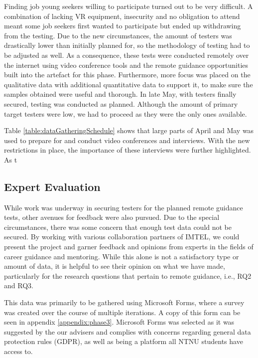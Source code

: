 Finding job young seekers willing to participate turned out to be very difficult. A combination of lacking VR equipment, insecurity and no obligation to attend meant some job seekers first wanted to participate but ended up withdrawing from the testing. Due to the new circumstances, the amount of testers was drastically lower than initially planned for, so the methodology of testing had to be adjusted as well. As a consequence, these tests were conducted remotely over the internet using video conference tools and the remote guidance opportunities built into the artefact for this phase. Furthermore, more focus was placed on the qualitative data with additional quantitative data to support it, to make sure the samples obtained were useful and thorough. In late May, with testers finally secured, testing was conducted as planned. Although the amount of primary target testers were low, we had to proceed as they were the only ones available.   

Table \ref{table:dataGatheringSchedule} shows that large parts of April and May was used to prepare for and conduct video conferences and interviews. With the new restrictions in place, the importance of these interviews were further highlighted. As t

\subsection{Expert Evaluation}
\label{section:phase3_expertEval}
While work was underway in securing testers for the planned remote guidance tests, other avenues for feedback were also pursued. Due to the special circumstances, there was some concern that enough test data could not be secured. By working with various collaboration partners of IMTEL, we could present the project and garner feedback and opinions from experts in the fields of career guidance and mentoring. While this alone is not a satisfactory type or amount of data, it is helpful to see their opinion on what we have made, particularly for the research questions that pertain to remote guidance, i.e., RQ2 and RQ3.

This data was primarily to be gathered using Microsoft Forms, where a survey was created over the course of multiple iterations. A copy of this form can be seen in appendix \ref{appendix:phase3}. Microsoft Forms was selected as it was suggested by the our advisers and complies with concerns regarding general data protection rules (GDPR), as well as being a platform all NTNU students have access to.

